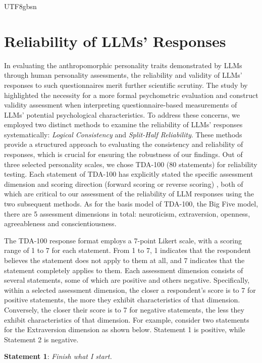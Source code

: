 \documentclass{article}
\theoremstyle{plain}
\theoremstyle{definition}
\theoremstyle{remark}
\begin{document}
\begin{CJK*}{UTF8}{gbsn}
\section{Reliability of LLMs' Responses}\label{sec-reliability}
In evaluating the anthropomorphic personality traits demonstrated by LLMs through human personality assessments, the reliability and validity of LLMs' responses to such questionnaires merit further scientific scrutiny. The study by \citet{miotto-etal-2022-gpt} highlighted the necessity for a more formal psychometric evaluation and construct validity assessment when interpreting questionnaire-based measurements of LLMs' potential psychological characteristics. To address these concerns, we employed two distinct methods to examine the reliability of LLMs' responses systematically: \textit{Logical Consistency} and \textit{Split-Half Reliability}. These methods provide a structured approach to evaluating the consistency and reliability of responses, which is crucial for ensuring the robustness of our findings. Out of three selected personality scales, we chose TDA-100 (80 statements) for reliability testing. Each statement of TDA-100 has explicitly stated the specific assessment dimension and scoring direction (forward scoring or reverse scoring) \citep{goldberg1992development}, both of which are critical to our assessment of the reliability of LLM responses using the two subsequent methods. As for the basis model of TDA-100, the Big Five model, there are 5 assessment dimensions in total: neuroticism, extraversion, openness, agreeableness and conscientiousness. 

The TDA-100 response format employs a 7-point Likert scale, with a scoring range of 1 to 7 for each statement. From 1 to 7, 1 indicates that the respondent believes the statement does not apply to them at all, and 7 indicates that the statement completely applies to them. Each assessment dimension consists of several statements, some of which are positive and others negative. Specifically, within a selected assessment dimension, the closer a respondent's score is to 7 for positive statements, the more they exhibit characteristics of that dimension. Conversely, the closer their score is to 7 for negative statements, the less they exhibit characteristics of that dimension. For example, consider two statements for the Extraversion dimension as shown below. Statement 1 is positive, while Statement 2 is negative.

\textbf{Statement 1}: \textit{Finish what I start.}


\end{CJK*}
\end{document}

